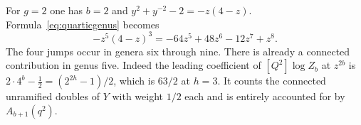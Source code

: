 For $g=2$ one has $b=2$ and $y^2+y^{-2}-2=-z(4-z)$.
Formula~\eqref{eq:quarticgenus} becomes
\[
 -z^5(4-z)^3=-64z^5+48z^6-12z^7+z^8.
\]
The four jumps occur in genera six through nine. There is already
a connected contribution in genus five. Indeed the leading
coefficient of $[Q^2]\log Z_b$ at $z^{2b}$ is
$2\cdot4^b-\tfrac12=(2^{2h}-1)/2$, which is $63/2$ at $h=3$.
It counts the connected unramified doubles of $Y$ with weight
$1/2$ each and is entirely accounted for by $A_{b+1}(q^2)$.
